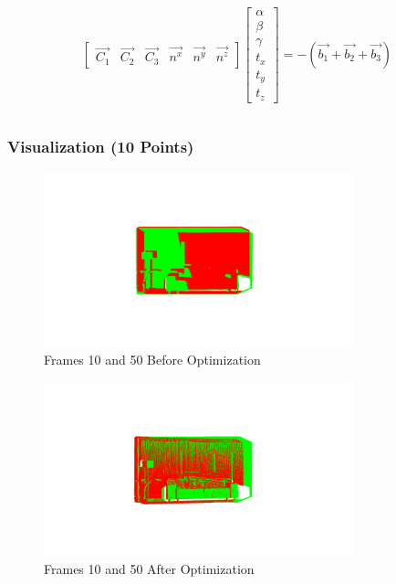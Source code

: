\documentclass[12pt, a4paper]{article}
\begin{document}
$$\begin{bmatrix}
    \vec{C_1} &
    \vec{C_2} &
    \vec{C_3} & 
    \vec{n^x} &
    \vec{n^y} &
    \vec{n^z}
\end{bmatrix}
\begin{bmatrix}
    \alpha \\
    \beta \\
    \gamma \\
    t_x \\
    t_y \\
    t_z
\end{bmatrix}
=
-(\vec{b_1} + \vec{b_2} + \vec{b_3})
$$

$$
$$


\subsubsection{Visualization (10 Points)}
\begin{figure}[!htb]
    \centering
    \includegraphics[width=0.8\textwidth]{Before_1_50.png}
    \caption{Frames 10 and 50 Before Optimization}
\end{figure}
\begin{figure}[!htb]
    \centering
    \includegraphics[width=0.8\textwidth]{After_1_50.png}
    \caption{Frames 10 and 50 After Optimization}
\end{figure}
\clearpage
\end{document}
